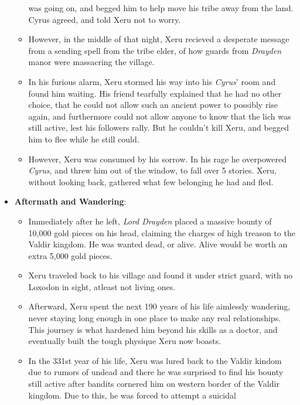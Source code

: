 \documentclass[12pt]{article}
\begin{document}
\begin{itemize}
\begin{itemize}
          was going on, and begged him to help move his tribe away from the
          land. Cyrus agreed, and told Xeru not to worry.
        \item However, in the middle of that night, Xeru recieved a desperate
          message from a sending spell from the tribe elder, of how guards from
          \textit{Drayden} manor were massacring the village.
        \item In his furious alarm, Xeru stormed his way into his
          \textit{Cyrus}' room and found him waiting. His friend tearfully
          explained that he had no other choice, that he could not allow such an
          ancient power to possibly rise again, and furthermore could not allow
          anyone to know that the lich was still active, lest his followers
          rally. But he couldn't kill Xeru, and begged him to flee while he
          still could.
        \item However, Xeru was consumed by his sorrow. In his rage he
          overpowered \textit{Cyrus}, and threw him out of the window, to fall
          over 5 stories. Xeru, without looking back, gathered what few
          belonging he had and fled.
      \end{itemize}
    \item \textbf{Aftermath and Wandering}:
      \begin{itemize}
        \item Immediately after he left, \textit{Lord Drayden} placed a massive
          bounty of 10,000 gold pieces on his head, claiming the charges of high
          treason to the Valdir kingdom. He was wanted dead, or alive. Alive
          would be worth an extra 5,000 gold pieces.
        \item Xeru traveled back to his village and found it under strict guard,
          with no Loxodon in sight, atleast not living ones.
        \item Afterward, Xeru spent the next 190 years of his life aimlessly
          wandering, never staying long enough in one place to make any real
          relationships. This journey is what hardened him beyond his skills as
          a doctor, and eventually built the tough physique Xeru now boasts.
        \item In the 331st year of his life, Xeru was lured back to the Valdir
          kindom due to rumors of undead and there he was surprised to find his
          bounty still active after bandits cornered him on western border of
          the Valdir kingdom. Due to this, he was forced to attempt a suicidal

\end{itemize}
\end{itemize}
\end{document}

